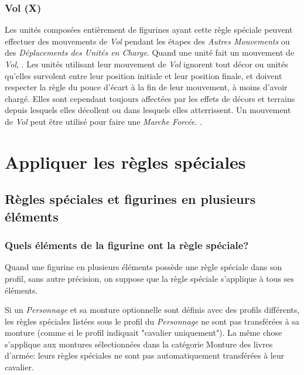 \subsubsection*{Vol (X)}

Les unités composées entièrement de figurines ayant cette règle spéciale peuvent effectuer des mouvements de \emph{Vol} pendant les étapes des \emph{Autres Mouvements} ou des \emph{Déplacements des Unités en Charge}. Quand une unité fait un mouvement de \emph{Vol}, . Les unités utilisant leur mouvement de \emph{Vol} ignorent tout décor ou unités qu'elles survolent entre leur position initiale et leur position finale, et doivent respecter la règle du pouce d'écart à la fin de leur mouvement, à moins d'avoir chargé. Elles sont cependant toujours affectées par les effets de décors et terrains depuis lesquels elles décollent ou dans lesquels elles atterrissent. Un mouvement de \emph{Vol} peut être utilisé pour faire une \emph{Marche Forcée}. .

\section{Appliquer les règles spéciales}

\subsection{Règles spéciales et figurines en plusieurs éléments}

\subsubsection*{Quels éléments de la figurine ont la règle spéciale?}

Quand une figurine en plusieurs éléments possède une règle spéciale dans son profil, sans autre précision, on suppose que la règle spéciale s'applique à tous ses éléments.

Si un \emph{Personnage} et sa monture optionnelle sont définis avec des profils différents, les règles spéciales listées sous le profil du \emph{Personnage} ne sont pas transférées à sa monture (comme si le profil indiquait "cavalier uniquement"). La même chose s'applique aux montures sélectionnées dans la catégorie Monture des livres d'armée: leurs règles spéciales ne sont pas automatiquement transférées à leur cavalier.

